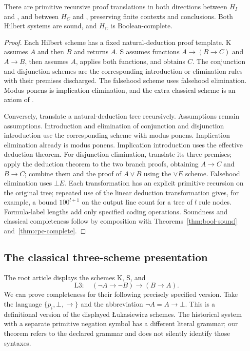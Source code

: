 \begin{theorem}\label{thm:hilbert-equivalence}
There are primitive recursive proof translations in both directions between
$H_I$ and \IPC, and between $H_C$ and \CPC, preserving finite contexts
and conclusions. Both Hilbert systems are sound, and $H_C$ is Boolean-complete.
\end{theorem}
\begin{proof}
Each Hilbert scheme has a fixed natural-deduction proof template. K assumes
$A$ and then $B$ and returns $A$. S assumes functions $A\to(B\to C)$ and
$A\to B$, then assumes $A$, applies both functions, and obtains $C$.
The conjunction and disjunction schemes are the corresponding introduction
or elimination rules with their premises discharged. The falsehood scheme
uses falsehood elimination. Modus ponens is implication elimination, and
the extra classical scheme is an axiom of \CPC.

Conversely, translate a natural-deduction tree recursively. Assumptions
remain assumptions. Introduction and elimination of conjunction and
disjunction introduction use the corresponding scheme with modus ponens.
Implication elimination already is modus ponens. Implication introduction
uses the effective deduction theorem. For disjunction elimination, translate
its three premises; apply the deduction theorem to the two branch proofs,
obtaining $A\to C$ and $B\to C$; combine them and the proof of $A\vee B$
using the $\vee E$ scheme. Falsehood elimination uses $\bot E$.
Each transformation has an explicit primitive recursion on the original
tree; repeated use of the linear deduction transformation gives, for
example, a bound $100^{l+1}$ on the output line count for a tree of $l$
rule nodes. Formula-label lengths add only specified coding operations.
Soundness and classical completeness follow by composition with
Theorems~\ref{thm:bool-sound} and~\ref{thm:cpc-complete}.
\end{proof}

\subsection{The classical three-scheme presentation}

The root article displays the schemes K, S, and
\[
 \mathrm{L3}:\quad(\neg A\to\neg B)\to(B\to A).
\]
We can prove completeness for their following precisely specified version.
Take the language $\{p_i,\bot,\to\}$ and the abbreviation
$\neg A=A\to\bot$. This is a definitional version of the displayed
\L{}ukasiewicz schemes. The historical system with a separate primitive
negation symbol has a different literal grammar; our theorem refers to
the declared grammar and does not silently identify those syntaxes.

